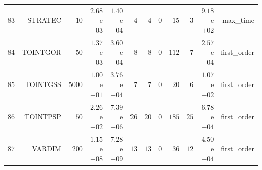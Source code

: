 \begin{longtable}{rrrrrrrrrrrr}
  \(    83\) & STRATEC & \(    10\) & \( 2.68\)e\(+03\) & \( 1.40\)e\(+04\) & \(     4\) & \(     4\) & \(     0\) & \(    15\) & \(     3\) & \( 9.18\)e\(+02\) & max\_time \\
  \(    84\) & TOINTGOR & \(    50\) & \( 1.37\)e\(+03\) & \( 3.60\)e\(-04\) & \(     8\) & \(     8\) & \(     0\) & \(   112\) & \(     7\) & \( 2.57\)e\(-04\) & first\_order \\
  \(    85\) & TOINTGSS & \(  5000\) & \( 1.00\)e\(+01\) & \( 3.76\)e\(-04\) & \(     7\) & \(     7\) & \(     0\) & \(    20\) & \(     6\) & \( 1.07\)e\(-02\) & first\_order \\
  \(    86\) & TOINTPSP & \(    50\) & \( 2.26\)e\(+02\) & \( 7.39\)e\(-06\) & \(    26\) & \(    20\) & \(     0\) & \(   185\) & \(    25\) & \( 6.78\)e\(-04\) & first\_order \\
  \(    87\) & VARDIM & \(   200\) & \( 1.15\)e\(+08\) & \( 7.28\)e\(+09\) & \(    13\) & \(    13\) & \(     0\) & \(    36\) & \(    12\) & \( 4.50\)e\(-04\) & first\_order \\\hline
\end{longtable}
